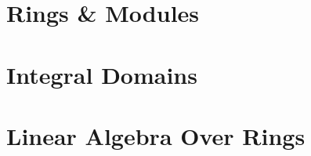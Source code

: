 \documentclass[../../../deep-dive]{subfiles}
\begin{document}
\chapter{Rings \& Modules}





\chapter{Integral Domains}



\chapter{Linear Algebra Over Rings}




\end{document}
